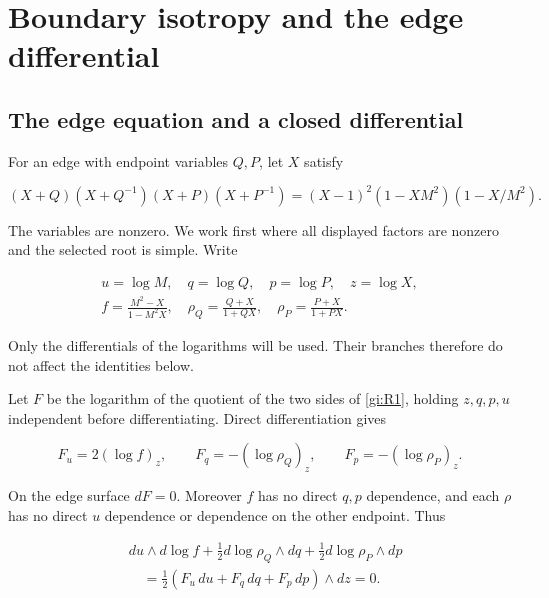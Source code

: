 \section{Boundary isotropy and the edge differential}\label{gi:boundary-isotropy-and-the-edge-differential}

\subsection{The edge equation and a closed differential}\label{gi:the-edge-equation-and-a-closed-differential}

For an edge with endpoint variables \(Q,P\), let \(X\) satisfy

\begin{equation}\label{gi:R1}
(X+Q)(X+Q^{-1})(X+P)(X+P^{-1})
      =(X-1)^2(1-XM^2)(1-X/M^2).
\end{equation}

The variables are nonzero. We work first where all displayed factors
are nonzero and the selected root is simple. Write

\begin{equation}\label{gi:R2}
\begin{gathered}
 u=\log M,\quad q=\log Q,\quad p=\log P,\quad z=\log X,\\
 f=\frac{M^2-X}{1-M^2X},\quad
 \rho_Q=\frac{Q+X}{1+QX},\quad
 \rho_P=\frac{P+X}{1+PX}.
 \end{gathered}
\end{equation}

Only the differentials of the logarithms will be used. Their branches
therefore do not affect the identities below.

Let \(F\) be the logarithm of the quotient of the two sides of
\eqref{gi:R1}, holding \(z,q,p,u\) independent before differentiating.
Direct differentiation gives

\begin{equation}\label{gi:R3}
F_u=2(\log f)_z,\qquad
 F_q=-(\log\rho_Q)_z,\qquad
 F_p=-(\log\rho_P)_z.
\end{equation}

On the edge surface \(dF=0\). Moreover \(f\) has no direct
\(q,p\) dependence, and each \(\rho\) has no direct
\(u\) dependence or dependence on the other endpoint. Thus

\begin{equation}\label{gi:R4}
\begin{aligned}
 &du\wedge d\log f+
   \tfrac12d\log\rho_Q\wedge dq+
   \tfrac12d\log\rho_P\wedge dp\\
 &\quad=\tfrac12(F_u\,du+F_q\,dq+F_p\,dp)\wedge dz=0.
 \end{aligned}
\end{equation}

